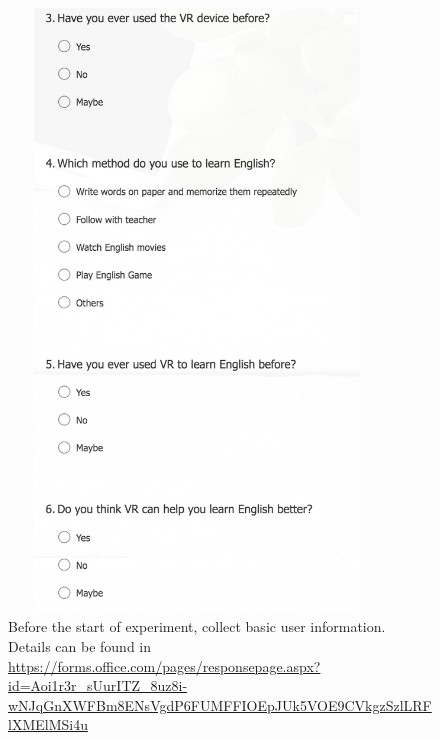 \documentclass{vgtc}                          %
\begin{document}
\begin{figure}[H]
 \centering 
 \includegraphics[width=10cm, height=16cm]{pictures/InfoSurvey.png}
 \caption{Before the start of experiment, collect basic user information. Details can be found in \url{https://forms.office.com/pages/responsepage.aspx?id=Aoi1r3r_sUurITZ_8uz8i-wNJqGnXWFBm8ENsVgdP6FUMFFIOEpJUk5VOE9CVkgzSzlLRFlXMElMSi4u} }
   \label{fig:infosurvey}
\end{figure}
\end{document}
